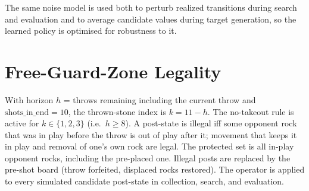 \documentclass[11pt]{article}
\begin{document}
The same noise model is used both to perturb realized transitions during
search and evaluation and to average candidate values during target
generation, so the learned policy is optimised for robustness to it.

\section{Free-Guard-Zone Legality}
\label{app:fgz}
With horizon $h$ = throws remaining including the current throw and
$\text{shots\_in\_end}=10$, the thrown-stone index is $k=11-h$. The
no-takeout rule is active for $k\in\{1,2,3\}$ (i.e.\ $h\ge 8$). A post-state
is illegal iff some opponent rock that was in play before the throw is out
of play after it; movement that keeps it in play and removal of one's own
rock are legal. The protected set is all in-play opponent rocks, including
the pre-placed one. Illegal posts are replaced by the pre-shot board
(throw forfeited, displaced rocks restored). The operator is applied to
every simulated candidate post-state in collection, search, and
evaluation.



\end{document}
